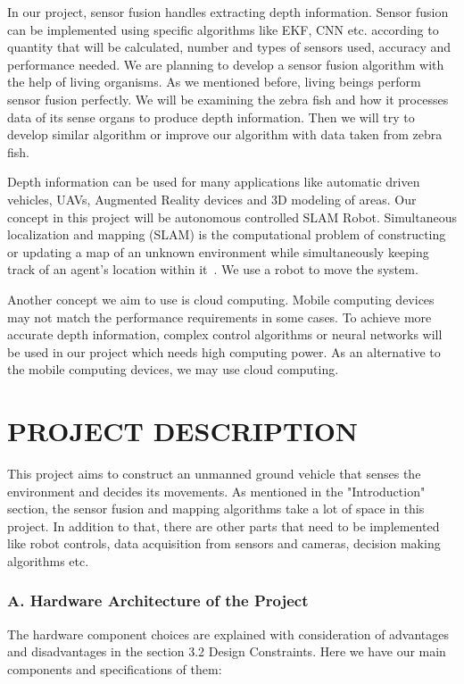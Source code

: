 \documentclass[12pt]{article}
\begin{document}
In our project, sensor fusion handles extracting depth information. Sensor fusion can be implemented using specific algorithms like EKF, CNN etc. according to quantity that will be calculated, number and types of sensors used, accuracy and performance needed. We are planning to develop a sensor fusion algorithm with the help of living organisms. As we mentioned before, living beings perform sensor fusion perfectly. We will be examining the zebra fish and how it processes data of its sense organs to produce depth information. Then we will try to develop similar algorithm or improve our algorithm with data taken from zebra fish. 

Depth information can be used for many applications like automatic driven vehicles, UAVs, Augmented Reality devices and 3D modeling of areas. Our concept in this project will be autonomous controlled SLAM Robot. Simultaneous localization and mapping (SLAM) is the computational problem of constructing or updating a map of an unknown environment while simultaneously keeping track of an agent's location within it~\cite{enwiki:1120084976}. We use a robot to move the system. 

Another concept we aim to use is cloud computing. Mobile computing devices may not match the performance requirements in some cases. To achieve more accurate depth information, complex control algorithms or neural networks will be used in our project which needs high computing power. As an alternative to the mobile computing devices, we may use cloud computing.  

\section{PROJECT DESCRIPTION}

This project aims to construct an unmanned ground vehicle that senses the environment and decides its movements. As mentioned in the "Introduction" section, the sensor fusion and mapping algorithms take a lot of space in this project. In addition to that, there are other parts that need to be implemented like robot controls, data acquisition from sensors and cameras, decision making algorithms etc. 

    \subsubsection*{A. Hardware Architecture of the Project}

    The hardware component choices are explained with consideration of advantages and disadvantages in the section 3.2 Design Constraints. Here we have our main components and specifications of them: 
\end{document}
